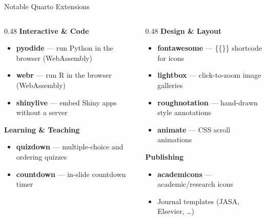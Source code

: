 \documentclass[aspectratio=169, t]{beamer}
\begin{document}
\begin{frame}{Notable Quarto Extensions}
	\small
    \begin{columns}[t]
        \begin{column}{0.48\textwidth}
            \textbf{Interactive \& Code}
            \begin{itemize}
                \item \textbf{pyodide} — run Python in the browser (WebAssembly)
                \item \textbf{webr} — run R in the browser (WebAssembly)
                \item \textbf{shinylive} — embed Shiny apps without a server
            \end{itemize}
            \vspace{0.3cm}
            \textbf{Learning \& Teaching}
            \begin{itemize}
                \item \textbf{quizdown} — multiple-choice and ordering quizzes
                \item \textbf{countdown} — in-slide countdown timer
            \end{itemize}
        \end{column}
        \begin{column}{0.48\textwidth}
            \textbf{Design \& Layout}
            \begin{itemize}
                \item \textbf{fontawesome} — \{\{< fa icon >\}\} shortcode for icons
                \item \textbf{lightbox} — click-to-zoom image galleries
                \item \textbf{roughnotation} — hand-drawn style annotations
                \item \textbf{animate} — CSS scroll animations
            \end{itemize}
            \vspace{0.3cm}
            \textbf{Publishing}
            \begin{itemize}
                \item \textbf{academicons} — academic/research icons
                \item Journal templates (JASA, Elsevier, \dots)
            \end{itemize}
        \end{column}
    \end{columns}
\end{frame}
\end{document}
